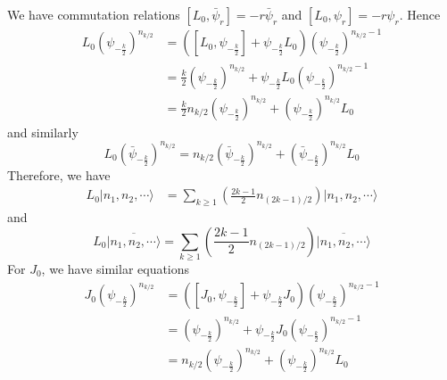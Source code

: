\subsubsection{}
We have commutation relations $[L_0, \bar{\psi}_r] = - r \bar{\psi}_r$ and $[L_0, \psi_r] = -r \psi_r$. Hence
\begin{equation}
	\begin{split}
	 L_0 \left(\psi_{-\frac{k}{2}} \right)^{n_{k/2}} & = \left([L_0, \psi_{-\frac{k}{2}}] + \psi_{-\frac{k}{2}} L_0 \right) \left( \psi_{-\frac{k}{2}} \right)^{n_{k/2}-1}\\
	 & =\frac{k}{2}\left( \psi_{-\frac{k}{2}} \right)^{n_{k/2}} + \psi_{-\frac{k}{2}}L_0 \left(\psi_{-\frac{k}{2}} \right)^{n_{k/2}-1}\\
	 & =\frac{k}{2} n_{k/2} \left(\psi_{-\frac{k}{2}} \right)^{n_{k/2}} + \left( \psi_{-\frac{k}{2}} \right) ^{n_{k/2}}L_0
	\end{split}
\end{equation}
and similarly
\begin{equation}
	 L_0 \left(\bar{\psi}_{-\frac{k}{2}} \right)^{n_{k/2}} =n_{k/2} \left(\bar{\psi}_{-\frac{k}{2}} \right)^{n_{k/2}} + \left( \bar{\psi}_{-\frac{k}{2}} \right) ^{n_{k/2}}L_0
\end{equation}
Therefore, we have
\begin{equation}
	\begin{split}
	L_0 |n_1,n_2,\cdots \rangle & = \sum_{k \geq 1} \left(\frac{2k-1}{2} n_{(2k-1)/2} \right)|n_1,n_2,\cdots \rangle
	\end{split}
\end{equation}
and
\begin{equation}
	L_0 \overline{|n_1,n_2, \cdots\rangle}= \sum_{k \geq 1} \left(\frac{2k-1}{2} n_{(2k-1)/2} \right)\overline{|n_1,n_2,\cdots \rangle}
\end{equation}
For $J_0$, we have similar equations
\begin{equation}
\begin{split}
J_0 \left(\psi_{-\frac{k}{2}} \right)^{n_{k/2}} & = \left([J_0, \psi_{-\frac{k}{2}}] + \psi_{-\frac{k}{2}} J_0 \right) \left( \psi_{-\frac{k}{2}} \right)^{n_{k/2}-1}\\
& =\left( \psi_{-\frac{k}{2}} \right)^{n_{k/2}} + \psi_{-\frac{k}{2}}J_0 \left(\psi_{-\frac{k}{2}} \right)^{n_{k/2}-1}\\
& = n_{k/2} \left(\psi_{-\frac{k}{2}} \right)^{n_{k/2}} + \left( \psi_{-\frac{k}{2}} \right) ^{n_{k/2}}L_0
\end{split}
\end{equation}

